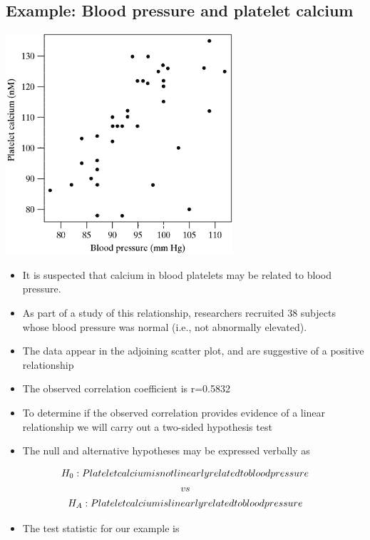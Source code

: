 \documentclass[
]{book}
\providecommand{\tightlist}{%
  \setlength{\itemsep}{0pt}\setlength{\parskip}{0pt}}
\begin{document}
\hypertarget{example-blood-pressure-and-platelet-calcium}{%
\subsection{Example: Blood pressure and platelet calcium}\label{example-blood-pressure-and-platelet-calcium}}

\includegraphics[width=0.5\linewidth]{./11_48}

\begin{itemize}
\tightlist
\item
  It is suspected that calcium in blood platelets may be related to blood pressure.
\item
  As part of a study of this relationship, researchers recruited 38 subjects whose blood pressure was normal (i.e., not abnormally elevated).
\item
  The data appear in the adjoining scatter plot, and are suggestive of a positive relationship
\item
  The observed correlation coefficient is r=0.5832
\item
  To determine if the observed correlation provides evidence of a linear relationship we will carry out a two-sided hypothesis test
\item
  The null and alternative hypotheses may be expressed verbally as
\end{itemize}

\[H_0:Platelet\space calcium\space is\space not\space linearly\space related\space to\space blood\space pressure\]
\[vs\]
\[H_A: Platelet\space calcium\space is\space linearly\space related\space to\space blood\space pressure\]

\begin{itemize}
\tightlist
\item
  The test statistic for our example is
\end{itemize}
\end{document}
